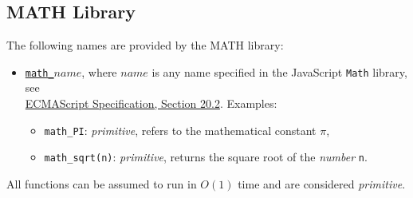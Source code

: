 \subsection*{MATH Library}


The following names are provided by the MATH library:
\begin{itemize}
\item \href{https://source-academy.github.io/sicp/chapters/1.1.4.html\#p8}{\lstinline{math_}$\textit{name}$},
where $\textit{name}$ is any name specified in the
JavaScript
\texttt{Math} library, see\\
\href{https://www.ecma-international.org/ecma-262/9.0/index.html\#sec-math-object}{\color{DarkBlue}ECMAScript Specification, Section 20.2}. Examples:
\begin{itemize}
\item \verb#math_PI#: \textit{primitive}, refers to the mathematical constant $\pi$,
\item \verb#math_sqrt#\texttt{(n)}: \textit{primitive}, returns the square root of the \emph{number} \texttt{n}.
\end{itemize}
\end{itemize}
All functions can be assumed to run in $O(1)$ time and are considered
\textit{primitive}.
